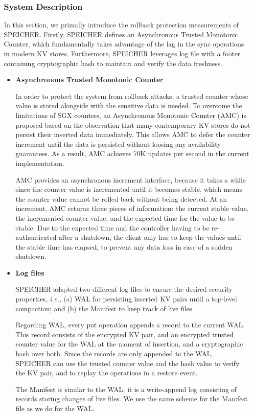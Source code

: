 \subsubsection{System Description}
In this section, we primally introduce the rollback protection measurements of SPEICHER. Firstly, SPEICHER defines an Asynchronous Trusted Monotonic Counter, which fundamentally takes advantage of the lag in the sync operations in modern KV stores. Furthermore, SPEICHER leverages log file with a footer containing cryptographic hash to maintain and verify the data freshness. 
\begin{itemize}
	\item \textbf{Asynchronous Trusted Monotonic Counter}
	
	 In order to protect the system from rollback attacks, a trusted counter whose value is stored alongside with the sensitive data is needed. To overcome the limitations of SGX counters, an Asynchronous Monotonic Counter (AMC) is proposed based on the observation that many contemporary KV stores do not persist their inserted data immediately. This allows AMC to defer the counter increment until the data is persisted without loosing any availability guarantees. As a result, AMC achieves 70K updates per second in the current implementation.

AMC provides an asynchronous increment interface, because it takes a while since the counter value is incremented until it becomes stable, which means the counter value cannot be rolled back without being detected. At an increment, AMC returns three pieces of information: the current stable value, the incremented counter value, and the expected time for the value to be stable. Due to the expected time and the controller having to be re-authenticated after a shutdown, the client only has to keep the values until the stable time has elapsed, to prevent any data loss in case of a sudden shutdown.

	
	\item \textbf{Log files}
	
	SPEICHER adapted two different log files to ensure the desired security properties, \textit{i.e.,} (a) WAL for persisting inserted KV pairs until a top-level compaction; and (b) the Manifest to keep track of live files. 
	
	Regarding WAL, every put operation appends a record to the current WAL. This record consists of the encrypted KV pair, and an encrypted trusted counter value for the WAL at the moment of insertion, and a cryptographic hash over both. Since the records are only appended to the WAL, SPEICHER can use the trusted counter value and the hash value to verify the KV pair, and to replay the operations in a restore event.

The Manifest is similar to the WAL; it is a write-append log consisting of records storing changes of live files. We use the same scheme for the Manifest file as we do for the WAL. 
\end{itemize}

